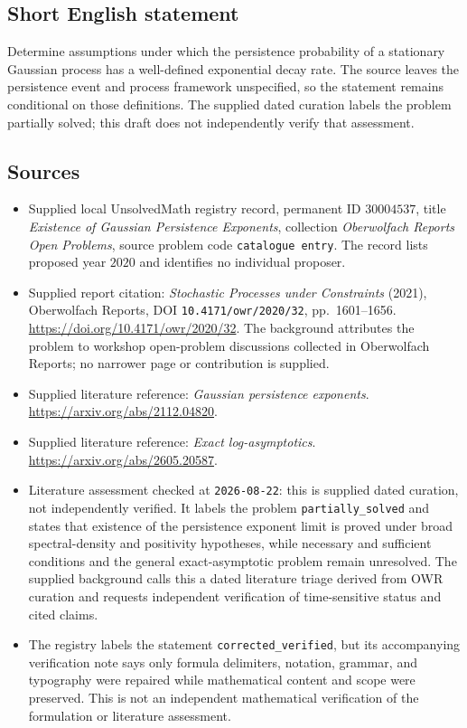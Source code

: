 \documentclass[11pt]{article}
\begin{document}
\subsection{Short English statement}
Determine assumptions under which the persistence probability of a stationary Gaussian process has a well-defined exponential decay rate. The source leaves the persistence event and process framework unspecified, so the statement remains conditional on those definitions. The supplied dated curation labels the problem partially solved; this draft does not independently verify that assessment.
\subsection{Sources}
\begin{itemize}
\item Supplied local UnsolvedMath registry record, permanent ID \(30004537\), title \emph{Existence of Gaussian Persistence Exponents}, collection \emph{Oberwolfach Reports Open Problems}, source problem code \texttt{catalogue entry}. The record lists proposed year \(2020\) and identifies no individual proposer.
\item Supplied report citation: \emph{Stochastic Processes under Constraints} (2021), Oberwolfach Reports, DOI \texttt{10.4171/owr/2020/32}, pp.~1601--1656. \url{https://doi.org/10.4171/owr/2020/32}. The background attributes the problem to workshop open-problem discussions collected in Oberwolfach Reports; no narrower page or contribution is supplied.
\item Supplied literature reference: \emph{Gaussian persistence exponents}. \url{https://arxiv.org/abs/2112.04820}.
\item Supplied literature reference: \emph{Exact log-asymptotics}. \url{https://arxiv.org/abs/2605.20587}.
\item Literature assessment checked at \texttt{2026-08-22}: this is supplied dated curation, not independently verified. It labels the problem \texttt{partially\_solved} and states that existence of the persistence exponent limit is proved under broad spectral-density and positivity hypotheses, while necessary and sufficient conditions and the general exact-asymptotic problem remain unresolved. The supplied background calls this a dated literature triage derived from OWR curation and requests independent verification of time-sensitive status and cited claims.
\item The registry labels the statement \texttt{corrected\_verified}, but its accompanying verification note says only formula delimiters, notation, grammar, and typography were repaired while mathematical content and scope were preserved. This is not an independent mathematical verification of the formulation or literature assessment.
\end{itemize}
\end{document}
